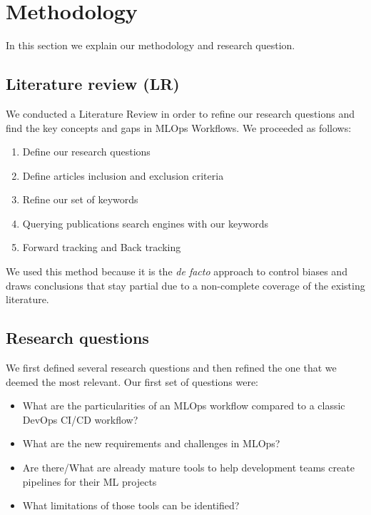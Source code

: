 \section{Methodology}\label{sec:methodo}
In this section we explain our methodology and research question.

\subsection{Literature review (LR)}\label{subsec:literature-review-(lr)}

We conducted a Literature Review in order to refine our research questions and find the key concepts and gaps in MLOps Workflows.
We proceeded as follows:

\begin{enumerate}
    \item Define our research questions
    \item Define articles inclusion and exclusion criteria
    \item Refine our set of keywords
    \item Querying publications search engines with our keywords
    \item Forward tracking and Back tracking
\end{enumerate}

We used this method because it is the \textit{de facto} approach to control biases and draws conclusions that stay partial due to
a non-complete coverage of the existing literature.

\subsection{Research questions}\label{subsec:research-questions}

We first defined several research questions and then refined the one that we deemed the most relevant.
Our first set of questions were:
\begin{itemize}
    \item What are the particularities of an MLOps workflow compared to a classic DevOps CI/CD workflow?
    \item What are the new requirements and challenges in MLOps?
    \item Are there/What are already mature tools to help development teams create pipelines for their ML projects
    \item What limitations of those tools can be identified?
\end{itemize}

